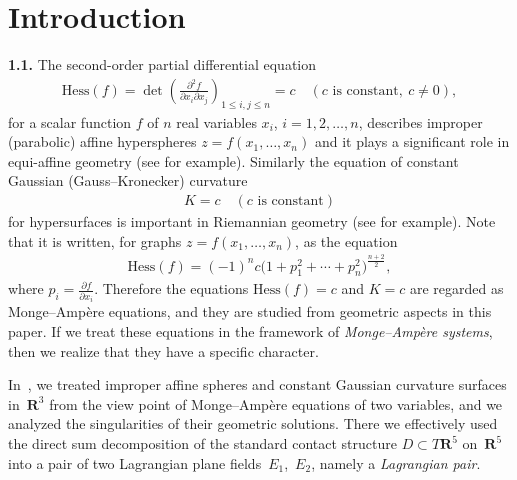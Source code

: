 \documentclass[pdftex]{sigma}
\begin{document}


\section{Introduction}

{\bf 1.1.}
The second-order partial dif\/ferential equation
\begin{gather*}
\mathrm{Hess}(f)=
\det\left(
\frac{\partial^2 f}{\partial x_i\partial x_j}
\right)_{1\leq i, j \leq n} = c \quad (\text{$c$ is constant}, \ c \not= 0),
\end{gather*}
for a scalar function $f$ of $n$ real variables $x_i$, $i = 1, 2, \dots, n$,
describes improper (parabolic)
af\/f\/ine hyperspheres
$
z = f(x_1, \dots, x_n)
$
and it
plays a signif\/icant role in equi-af\/f\/ine geometry (see \cite{N-S} for example).
Similarly the equation of constant Gaussian (Gauss--Kronecker) curvature
\begin{gather*}
K = c   \quad (\text{$c$ is constant})
\end{gather*}
for hypersurfaces is important
in Riemannian geometry (see \cite{K-N} for example).
Note that it is written, for graphs $z = f(x_1, \dots, x_n)$,
as the equation
\begin{gather*}
\mathrm{Hess}(f) =
(-1)^n c \big(1 + p_1^2 + \cdots + p_n^2\big)^{\frac{n+2}{2}},
\end{gather*}
where $p_i = \frac{\partial f}{\partial x_i}$.
Therefore the equations
${\mathrm{Hess}}(f) = c$ and
$K = c$ are regarded as Monge--Amp{\`e}re
equations, and they are studied from geometric aspects in this paper.
If we treat these equations in the framework of
{\it Monge--Amp{\`e}re systems},
then we realize that they have a specif\/ic character.

In~\cite{I-M}, we treated improper af\/f\/ine spheres and
constant Gaussian curvature surfaces in~${\mathbf{R}}^3$
from the view point of Monge--Amp{\`e}re equations of two variables,
and we analyzed the singula\-ri\-ties of their geometric solutions.
There we ef\/fectively used the direct sum decomposition of
the standard contact structure $D \subset T{\mathbf{R}}^5$ on~${\mathbf{R}}^5$
into a pair of two Lagrangian plane f\/ields~$E_1$,~$E_2$,
namely a {\it Lagrangian pair}.
\end{document}
